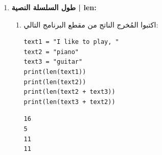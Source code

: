 \documentclass[14pt]{extarticle}
\begin{document}
\begin{enumerate}[resume, label=\textbf{تمرين \arabic*:}, wide=0pt, itemsep=2.2em]
\begin{enumerate}[label=\alph*.]
\begin{boxCode}
\begin{english}
\begin{verbatim}
num1 = "123"
num2 = "45"
num3 = "7"
print(num1 + num2)
print(num2 + num3)
print(num2 * 4)
print(num3 * 9)
\end{verbatim}
\end{english}
\end{boxCode}

\ifwithsols
\begin{boxSolution}
\begin{english}
\begin{verbatim}
12345
457
45454545
777777777
\end{verbatim}
\end{english}
\end{boxSolution}
\fi
\filbreak

\item استعملوا العاملين $+$ و $*$ والمتغيرين \textenglish{num2} و \textenglish{num3} فقط، واكتبوا أمر طباعة ينتج عنه المُخرج \textenglish{\texttt{457457457}}.
\ifwithsols
\begin{boxSolution}
\begin{english}
\begin{verbatim}
print((num2 + num3) * 3)
\end{verbatim}
\end{english}
\end{boxSolution}
\fi
\filbreak
\end{enumerate}
\filbreak

\item \textbf{طول السلسلة النصية | \textenglish{len}:}
\begin{enumerate}[label=\alph*.]
\item اكتبوا المُخرج الناتج من مقطع البرنامج التالي:

\begin{boxCode}
\begin{english}
\begin{verbatim}
text1 = "I like to play, "
text2 = "piano"
text3 = "guitar"
print(len(text1))
print(len(text2))
print(len(text2 + text3))
print(len(text3 + text2))
\end{verbatim}
\end{english}
\end{boxCode}

\ifwithsols
\begin{boxSolution}
\begin{english}
\begin{verbatim}
16
5
11
11
\end{verbatim}
\end{english}
\end{boxSolution}
\fi
\filbreak


\end{enumerate}
\end{enumerate}
\end{document}
